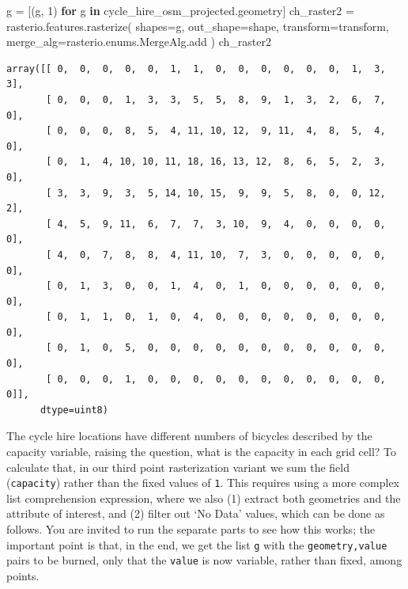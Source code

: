\documentclass[
  letterpaper,
]{krantz}
\newenvironment{Shaded}{\begin{snugshade}}{\end{snugshade}}
\newcommand{\ControlFlowTok}[1]{\textcolor[rgb]{0.00,0.23,0.31}{\textbf{#1}}}
\newcommand{\DecValTok}[1]{\textcolor[rgb]{0.68,0.00,0.00}{#1}}
\newcommand{\KeywordTok}[1]{\textcolor[rgb]{0.00,0.23,0.31}{\textbf{#1}}}
\newcommand{\NormalTok}[1]{\textcolor[rgb]{0.00,0.23,0.31}{#1}}
\newcommand{\OperatorTok}[1]{\textcolor[rgb]{0.37,0.37,0.37}{#1}}
\begin{document}
\begin{Shaded}
\begin{Highlighting}[]
\NormalTok{g }\OperatorTok{=}\NormalTok{ [(g, }\DecValTok{1}\NormalTok{) }\ControlFlowTok{for}\NormalTok{ g }\KeywordTok{in}\NormalTok{ cycle\_hire\_osm\_projected.geometry]}
\NormalTok{ch\_raster2 }\OperatorTok{=}\NormalTok{ rasterio.features.rasterize(}
\NormalTok{    shapes}\OperatorTok{=}\NormalTok{g,}
\NormalTok{    out\_shape}\OperatorTok{=}\NormalTok{shape,}
\NormalTok{    transform}\OperatorTok{=}\NormalTok{transform,}
\NormalTok{    merge\_alg}\OperatorTok{=}\NormalTok{rasterio.enums.MergeAlg.add}
\NormalTok{)}
\NormalTok{ch\_raster2}
\end{Highlighting}
\end{Shaded}

\begin{verbatim}
array([[ 0,  0,  0,  0,  0,  1,  1,  0,  0,  0,  0,  0,  0,  1,  3,  3],
       [ 0,  0,  0,  1,  3,  3,  5,  5,  8,  9,  1,  3,  2,  6,  7,  0],
       [ 0,  0,  0,  8,  5,  4, 11, 10, 12,  9, 11,  4,  8,  5,  4,  0],
       [ 0,  1,  4, 10, 10, 11, 18, 16, 13, 12,  8,  6,  5,  2,  3,  0],
       [ 3,  3,  9,  3,  5, 14, 10, 15,  9,  9,  5,  8,  0,  0, 12,  2],
       [ 4,  5,  9, 11,  6,  7,  7,  3, 10,  9,  4,  0,  0,  0,  0,  0],
       [ 4,  0,  7,  8,  8,  4, 11, 10,  7,  3,  0,  0,  0,  0,  0,  0],
       [ 0,  1,  3,  0,  0,  1,  4,  0,  1,  0,  0,  0,  0,  0,  0,  0],
       [ 0,  1,  1,  0,  1,  0,  4,  0,  0,  0,  0,  0,  0,  0,  0,  0],
       [ 0,  1,  0,  5,  0,  0,  0,  0,  0,  0,  0,  0,  0,  0,  0,  0],
       [ 0,  0,  0,  1,  0,  0,  0,  0,  0,  0,  0,  0,  0,  0,  0,  0]],
      dtype=uint8)
\end{verbatim}

The cycle hire locations have different numbers of bicycles described by
the capacity variable, raising the question, what is the capacity in
each grid cell? To calculate that, in our third point rasterization
variant we sum the field
(\texttt{\textquotesingle{}capacity\textquotesingle{}}) rather than the
fixed values of \texttt{1}. This requires using a more complex list
comprehension expression, where we also (1) extract both geometries and
the attribute of interest, and (2) filter out `No Data' values, which
can be done as follows. You are invited to run the separate parts to see
how this works; the important point is that, in the end, we get the list
\texttt{g} with the \texttt{geometry,value} pairs to be burned, only
that the \texttt{value} is now variable, rather than fixed, among
points.
\end{document}

